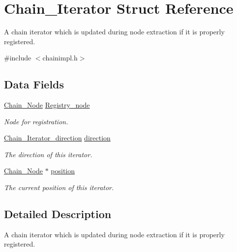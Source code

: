 \hypertarget{structChain__Iterator}{}\section{Chain\+\_\+\+Iterator Struct Reference}
\label{structChain__Iterator}


A chain iterator which is updated during node extraction if it is properly registered.  




{\ttfamily \#include $<$chainimpl.\+h$>$}

\subsection*{Data Fields}
\begin{DoxyCompactItemize}
\item 
\mbox{\hyperlink{group__RTEMSScoreChain_ga0dd4bfcca1ac7f90de2842e447846d3d}{Chain\+\_\+\+Node}} \mbox{\hyperlink{structChain__Iterator_acc2772c86c2f2102345a967b0d111df0}{Registry\+\_\+node}}
\begin{DoxyCompactList}\small\item\em Node for registration. \end{DoxyCompactList}\item 
\mbox{\hyperlink{group__RTEMSScoreChain_gac754c64a6c8a46b7b17cf3b7ac33124b}{Chain\+\_\+\+Iterator\+\_\+direction}} \mbox{\hyperlink{structChain__Iterator_ae816012b95f6ee7b0eff2f33bb9dfb86}{direction}}
\begin{DoxyCompactList}\small\item\em The direction of this iterator. \end{DoxyCompactList}\item 
\mbox{\hyperlink{group__RTEMSScoreChain_ga0dd4bfcca1ac7f90de2842e447846d3d}{Chain\+\_\+\+Node}} $\ast$ \mbox{\hyperlink{structChain__Iterator_a07a586990a24be3df71be20d64e5d2fc}{position}}
\begin{DoxyCompactList}\small\item\em The current position of this iterator. \end{DoxyCompactList}\end{DoxyCompactItemize}


\subsection{Detailed Description}
A chain iterator which is updated during node extraction if it is properly registered. 

